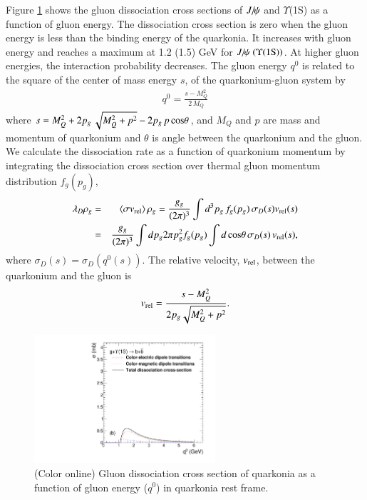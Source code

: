 {  Figure \ref{fig:SigmaDQ0} shows the gluon dissociation cross sections of $J\hspace{-.08em}/\hspace{-.14em}\psi$ and $\Upsilon$(1S)
  as a function of gluon energy. The dissociation cross section is zero when the gluon energy is less 
  than the binding energy of the quarkonia. It increases with gluon energy and reaches a maximum at 1.2 (1.5) GeV for 
  $J\hspace{-.08em}/\hspace{-.14em}\psi~(\Upsilon(1{\rm S}))$. At higher gluon energies, the interaction probability decreases. The gluon energy $q^0$ 
  is related to the square of the center of mass energy $s$, of the quarkonium-gluon system by
  \begin{eqnarray}
    q^{0} = \frac{s-M_{Q}^{2}}{2\,M_{Q}}
  \end{eqnarray}  
  where $s=M_{Q}^{2} + 2  p_g \, \sqrt{M_{Q}^2 + p^2} - 2  p_g \, p \, {\rm cos\theta}$, and $M_{Q}$ and $p$ 
  are mass and momentum of quarkonium and $\theta$ is angle between the quarkonium and the gluon.
  We calculate the dissociation rate as a function of quarkonium momentum 
  by integrating the dissociation cross section over thermal gluon momentum 
  distribution $f_{g}(p_g)$,   
  \begin{eqnarray}
    \lambda_{D} \rho_{g}  & = & \langle \sigma v_{\rm rel} \rangle \,\rho_{g}  = \frac{g_g}{(2\pi)^{3}} \int d^{3}p_g \, f_{g}(p_g)  \, \sigma_{D}(s) v_{\rm rel}(s)  \nonumber \\ 
    & = & \frac{g_g}{(2\pi)^{3}} \int dp_g 2\pi p_g^{2} f_{g}(p_g) \int d\,{\rm cos\theta}\,\sigma_{D}(s)\,v_{\rm rel}(s),
  \end{eqnarray}
  where $\sigma_{D}(s) = \sigma_{D}(q^0(s))$.
  The relative velocity, $v_{\rm rel}$, between the quarkonium and the gluon is
  \begin{eqnarray}
    v_{\rm rel}  = {s- M_{Q}^{2} \over 2  p_g\sqrt{M_{Q}^2 + p^2}}.  
    \label{eq7}
  \end{eqnarray}
  
  
  \begin{figure}
    \includegraphics[width=0.60\textwidth]{Figures/Quarkonia_502TeV/Fig1b_Y1S_SigmaDq0.pdf}
    \caption{(Color online) Gluon dissociation cross section of quarkonia as a function of gluon energy ($q^{0}$) in
      quarkonia rest frame.}
    \label{fig:SigmaDQ0}
  \end{figure}
  


}

